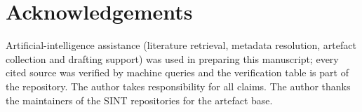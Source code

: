 \documentclass[11pt,a4paper]{article}
\begin{document}
\section*{Acknowledgements}
Artificial-intelligence assistance (literature retrieval, metadata resolution, artefact
collection and drafting support) was used in preparing this manuscript; every cited source was
verified by machine queries and the verification table is part of the repository. The author
takes responsibility for all claims. The author thanks the maintainers of the SINT
repositories for the artefact base.



\end{document}
